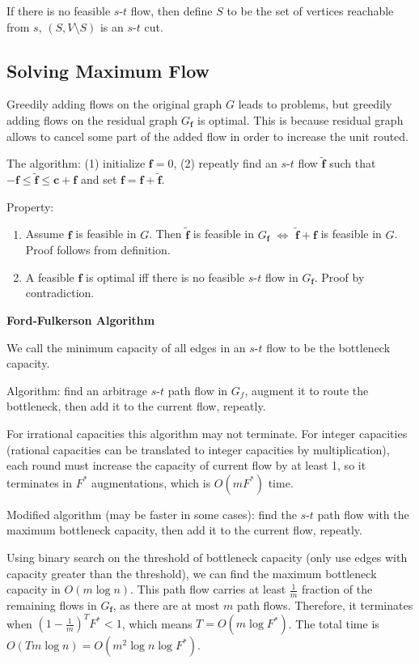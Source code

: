 If there is no feasible $s$-$t$ flow, then define $S$ to be the set of vertices reachable from $s$, $(S, V\setminus S)$ is an $s$-$t$ cut.

\subsection{Solving Maximum Flow}

Greedily adding flows on the original graph $G$ leads to problems, but greedily adding flows on the residual graph $G_{\boldsymbol{f}}$ is optimal. This is because residual graph allows to cancel some part of the added flow in order to increase the unit routed.

The algorithm: (1) initialize $\boldsymbol{f}=0$, (2) repeatly find an $s$-$t$ flow $\tilde{\boldsymbol{f}}$ such that $-\boldsymbol{f} \le \tilde{\boldsymbol{f}} \le \boldsymbol{c} + \boldsymbol{f}$ and set $\boldsymbol{f} = \boldsymbol{f} + \tilde{\boldsymbol{f}}$.

Property:
\begin{enumerate}
    \item Assume $\boldsymbol{f}$ is feasible in $G$. Then $\tilde{\boldsymbol{f}}$ is feasible in $G_{\boldsymbol{f}}$ $\Leftrightarrow$ $\tilde{\boldsymbol{f}} + \boldsymbol{f}$ is feasible in $G$. Proof follows from definition.
    \item A feasible $\boldsymbol{f}$ is optimal iff there is no feasible $s$-$t$ flow in $G_{\boldsymbol{f}}$. Proof by contradiction.
\end{enumerate}

\textbf{Ford-Fulkerson Algorithm}

We call the minimum capacity of all edges in an $s$-$t$ flow to be the bottleneck capacity.

Algorithm: find an arbitrage $s$-$t$ path flow in $G_f$, augment it to route the bottleneck, then add it to the current flow, repeatly. 

For irrational capacities this algorithm may not terminate. For integer capacities (rational capacities can be translated to integer capacities by multiplication), each round must increase the capacity of current flow by at least 1, so it terminates in $F^*$ augmentations, which is $O(m F^*)$ time.

Modified algorithm (may be faster in some cases): find the $s$-$t$ path flow with the maximum bottleneck capacity, then add it to the current flow, repeatly.

Using binary search on the threshold of bottleneck capacity (only use edges with capacity greater than the threshold), we can find the maximum bottleneck capacity in $O(m \log n)$. This path flow carries at least $\frac{1}{m}$ fraction of the remaining flows in $G_{\boldsymbol{f}}$, as there are at most $m$ path flows. Therefore, it terminates when $(1-\frac{1}{m})^T F^* < 1$, which means $T = O(m \log F^*)$. The total time is $O(T m \log n) = O(m^2 \log n \log F^*)$.

